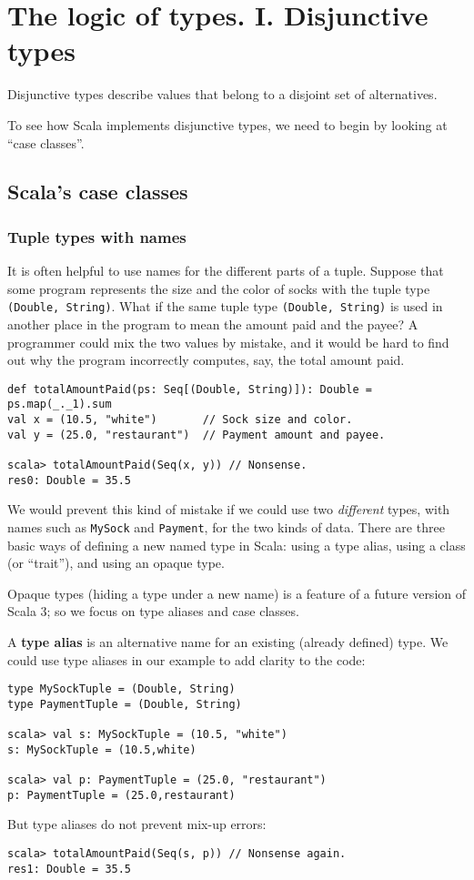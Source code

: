 
\chapter{The logic of types. I. Disjunctive types}

Disjunctive types describe values that belong to a disjoint set of
alternatives. 

To see how Scala implements disjunctive types, we need to begin by
looking at ``case classes''.

\section{Scala's case classes}

\subsection{Tuple types with names}

It is often helpful to use names for the different parts of a tuple.
Suppose that some program represents the size and the color of socks
with the tuple type \lstinline!(Double, String)!. What if the same
tuple type \lstinline!(Double, String)! is used in another place
in the program to mean the amount paid and the payee? A programmer
could mix the two values by mistake, and it would be hard to find
out why the program incorrectly computes, say, the total amount paid.
\begin{lstlisting}
def totalAmountPaid(ps: Seq[(Double, String)]): Double = ps.map(_._1).sum
val x = (10.5, "white")       // Sock size and color.
val y = (25.0, "restaurant")  // Payment amount and payee.

scala> totalAmountPaid(Seq(x, y)) // Nonsense.
res0: Double = 35.5
\end{lstlisting}

We would prevent this kind of mistake if we could use two \emph{different}
types, with names such as \lstinline!MySock! and \lstinline!Payment!,
for the two kinds of data. There are  three basic ways of defining
a new named type in Scala: using a type alias, using a class (or ``trait''),
and using an opaque type. 

Opaque types (hiding a type under a new name) is a feature of a future
version of Scala 3; so we focus on type aliases and case classes.

A \textbf{type alias} is an alternative name for
an existing (already defined) type. We could use type aliases in our
example to add clarity to the code:
\begin{lstlisting}
type MySockTuple = (Double, String)
type PaymentTuple = (Double, String)

scala> val s: MySockTuple = (10.5, "white")
s: MySockTuple = (10.5,white)

scala> val p: PaymentTuple = (25.0, "restaurant")
p: PaymentTuple = (25.0,restaurant)
\end{lstlisting}
But type aliases do not prevent mix-up errors:
\begin{lstlisting}
scala> totalAmountPaid(Seq(s, p)) // Nonsense again.
res1: Double = 35.5
\end{lstlisting}

